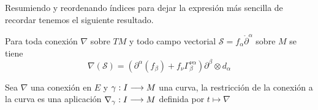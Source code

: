 Resumiendo y reordenando índices para dejar la expresión más sencilla de recordar tenemos el siguiente resultado.
\begin{proposition}
  Para toda conexión $\nabla$ sobre $TM$ y todo campo vectorial $\mathcal{S}=f_\alpha\mathring{\partial}^\alpha$
  sobre $M$ se tiene
  \begin{equation}
    \label{eq:conexion-coordenadas}
    \nabla(\mathcal{S}) = (\partial^\alpha(f_\beta)+f_\nu\Gamma_\beta^{\nu\alpha})\partial^\beta\otimes d_\alpha
  \end{equation}
\end{proposition}

Sea $\nabla$ una conexión en $E$ y $\gamma:I\longrightarrow M$ una curva, la restricción de la conexión a la curva es una
aplicación $\nabla_\gamma:I\longrightarrow M$ definida por $t\mapsto\nabla$